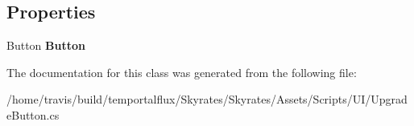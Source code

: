 \subsection*{Properties}
\begin{DoxyCompactItemize}
\item 
\hypertarget{class_skyrates_1_1_u_i_1_1_upgrade_button_aa720529e84ad6117fe047afc1357abfb}{Button {\bfseries Button}}\label{class_skyrates_1_1_u_i_1_1_upgrade_button_aa720529e84ad6117fe047afc1357abfb}

\end{DoxyCompactItemize}


The documentation for this class was generated from the following file\-:\begin{DoxyCompactItemize}
\item 
/home/travis/build/temportalflux/\-Skyrates/\-Skyrates/\-Assets/\-Scripts/\-U\-I/Upgrade\-Button.\-cs\end{DoxyCompactItemize}
